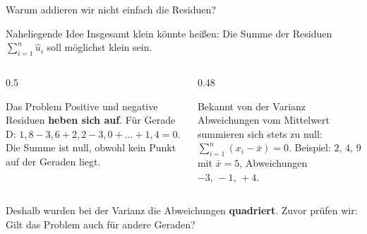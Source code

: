 \documentclass[aspectratio=169,11pt]{beamer}
\begin{document}
\begin{frame}{Warum addieren wir nicht einfach die Residuen?}
  \begin{block}{Naheliegende Idee}
    \glqq Insgesamt klein\grqq{} könnte heißen: Die Summe der Residuen
    $\sum_{i=1}^{n} \hat{u}_i$ soll möglichst klein sein.
  \end{block}

  \begin{columns}[T]
    \begin{column}{0.5\textwidth}
      \begin{alertblock}{Das Problem}
        Positive und negative Residuen \textbf{heben sich auf}. Für Gerade D:
        $1{,}8 - 3{,}6 + 2{,}2 - 3{,}0 + \ldots + 1{,}4 = 0$.
        Die Summe ist null, obwohl kein Punkt auf der Geraden liegt.
      \end{alertblock}
    \end{column}
    \begin{column}{0.48\textwidth}
      \begin{exampleblock}{Bekannt von der Varianz}
        Abweichungen vom Mittelwert summieren sich stets zu null:
        $\sum_{i=1}^{n} (x_i - \bar{x}) = 0$.
        Beispiel: $2,\,4,\,9$ mit $\bar{x} = 5$, Abweichungen $-3,\,-1,\,+4$.
      \end{exampleblock}
    \end{column}
  \end{columns}

  \medskip
  Deshalb wurden bei der Varianz die Abweichungen \textbf{quadriert}.
  Zuvor prüfen wir: Gilt das Problem auch für andere Geraden?
\end{frame}
\end{document}
